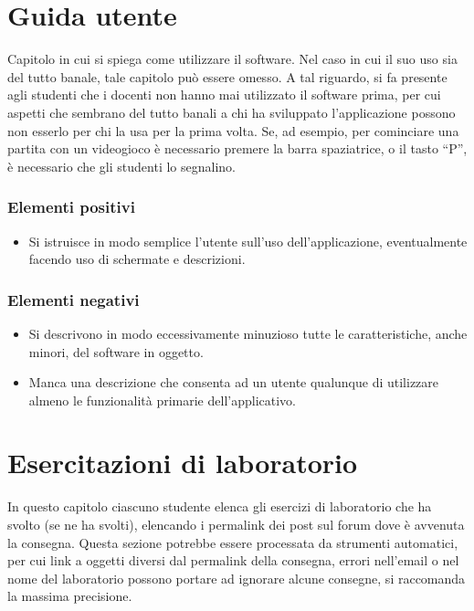 \documentclass[a4paper,12pt]{report}
\begin{document}
\appendix
\chapter{Guida utente}

Capitolo in cui si spiega come utilizzare il software. Nel caso in cui il suo uso sia del tutto
banale, tale capitolo può essere omesso.
%
A tal riguardo, si fa presente agli studenti che i docenti non hanno mai utilizzato il software
prima, per cui aspetti che sembrano del tutto banali a chi ha sviluppato l'applicazione possono non
esserlo per chi la usa per la prima volta.
%
Se, ad esempio, per cominciare una partita con un videogioco è necessario premere la barra
spaziatrice, o il tasto ``P'', è necessario che gli studenti lo segnalino.

\subsection*{Elementi positivi}

\begin{itemize}
 \item Si istruisce in modo semplice l'utente sull'uso dell'applicazione, eventualmente facendo uso di schermate e descrizioni.
\end{itemize}

\subsection*{Elementi negativi}
\begin{itemize}
 \item Si descrivono in modo eccessivamente minuzioso tutte le caratteristiche, anche minori, del software in oggetto.
 \item Manca una descrizione che consenta ad un utente qualunque di utilizzare almeno le funzionalità primarie dell'applicativo.
\end{itemize}

\chapter{Esercitazioni di laboratorio}

In questo capitolo ciascuno studente elenca gli esercizi di laboratorio che ha svolto
(se ne ha svolti),
elencando i permalink dei post sul forum dove è avvenuta la consegna.
%
Questa sezione potrebbe essere processata da strumenti automatici,
per cui link a oggetti diversi dal permalink della consegna,
errori nell'email o nel nome del laboratorio possono portare ad ignorare alcune consegne,
si raccomanda la massima precisione.
\end{document}
